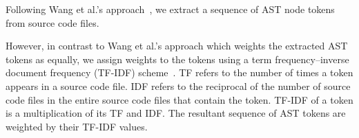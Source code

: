 Following Wang et al.'s approach~\cite{wang2016automatically}, we extract a sequence of AST node tokens from source code files. 

However, in contrast to Wang et al.'s approach which weights the extracted AST tokens as equally, we assign weights to the tokens using a term frequency--inverse document frequency (TF-IDF) scheme~\cite{manning2008introduction}. TF refers to the number of times a token appears in a source code file. IDF refers to the reciprocal of the number of source code files in the entire source code files that contain the token. TF-IDF of a token is a multiplication of its TF and IDF. The resultant sequence of AST tokens are weighted by their TF-IDF values.



